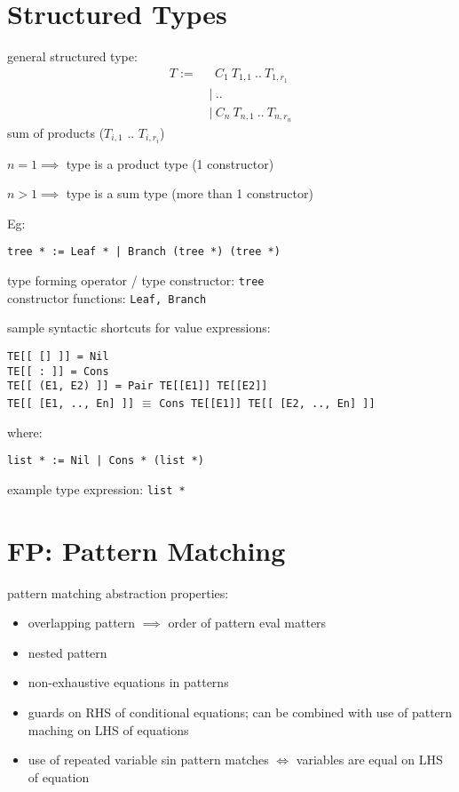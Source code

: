 \documentclass[8pt]{extarticle}
\begin{document}
\begin{multicols*}{2}
  \section{Structured Types}
  
  general structured type:
  \begin{align*}
    T :=\ & \ \ C_1\ T_{1,1}\ ..\ T_{1, r_1}\\
          & |\ ..\\
          & |\ C_n\ T_{n,1}\ ..\ T_{n, r_n}
  \end{align*}
  sum of products ($T_{i,1}$ .. $T_{i,r_i}$)

  $n=1 \implies$ type is a product type (1 constructor)
  
  $n>1 \implies$ type is a sum type (more than 1 constructor)
  
  Eg:
  
  \verb#tree * := Leaf * | Branch (tree *) (tree *)#

  type forming operator / type constructor: \verb|tree|\\
  constructor functions: \verb|Leaf, Branch|

  sample syntactic shortcuts for value expressions:

  \verb|TE[[ [] ]] = Nil|\\
  \verb|TE[[ : ]] = Cons|\\
  \verb|TE[[ (E1, E2) ]] = Pair TE[[E1]] TE[[E2]]|\\
  \verb|TE[[ [E1, .., En] ]]| $\equiv$ \verb|Cons TE[[E1]] TE[[ [E2, .., En] ]]|

  where:

  \verb#list * := Nil | Cons * (list *)#

  example type expression: \verb|list *|
  
  \section{FP: Pattern Matching}

  pattern matching abstraction properties:
  \begin{itemize}
  \item overlapping pattern $\implies$ order of pattern eval matters
  \item nested pattern
  \item non-exhaustive equations in patterns
  \item guards on RHS of conditional equations; can be combined with use of pattern maching on LHS of equations
  \item use of repeated variable sin pattern matches $\iff$ variables are equal on LHS of equation
  \end{itemize}


\end{multicols*}
\end{document}
